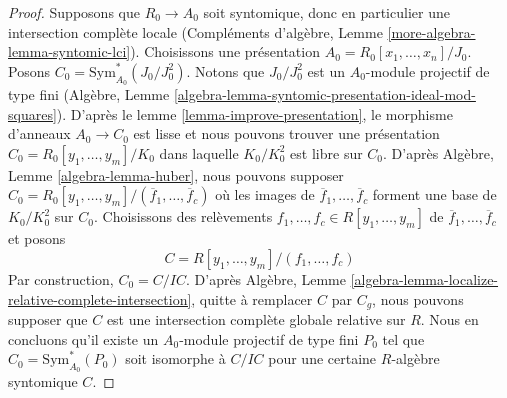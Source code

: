 \begin{proof}
Supposons que $R_0 \to A_0$ soit syntomique, donc en particulier une
intersection complète locale (Compléments d'algèbre, Lemme
\ref{more-algebra-lemma-syntomic-lci}).
Choisissons une présentation $A_0 = R_0[x_1, \ldots, x_n]/J_0$. Posons
$C_0 = \text{Sym}^*_{A_0}(J_0/J_0^2)$. Notons que $J_0/J_0^2$ est un
$A_0$-module projectif de type fini (Algèbre, Lemme
\ref{algebra-lemma-syntomic-presentation-ideal-mod-squares}).
D'après le lemme \ref{lemma-improve-presentation}, le morphisme d'anneaux
$A_0 \to C_0$ est lisse et nous pouvons trouver une présentation
$C_0 = R_0[y_1, \ldots, y_m]/K_0$ dans laquelle $K_0/K_0^2$ est libre sur
$C_0$. D'après Algèbre, Lemme \ref{algebra-lemma-huber}, nous pouvons supposer
$C_0 = R_0[y_1, \ldots, y_m]/(\overline{f}_1, \ldots, \overline{f}_c)$
où les images de $\overline{f}_1, \ldots, \overline{f}_c$ forment une base de
$K_0/K_0^2$ sur $C_0$. Choisissons des relèvements
$f_1, \ldots, f_c \in R[y_1, \ldots, y_m]$ de
$\overline{f}_1, \ldots, \overline{f}_c$ et posons
$$
C = R[y_1, \ldots, y_m]/(f_1, \ldots, f_c)
$$
Par construction, $C_0 = C/IC$. D'après Algèbre, Lemme
\ref{algebra-lemma-localize-relative-complete-intersection},
quitte à remplacer $C$ par $C_g$, nous pouvons supposer que $C$ est une
intersection complète globale relative sur $R$.
Nous en concluons qu'il existe un $A_0$-module projectif de type fini $P_0$ tel
que $C_0 = \text{Sym}^*_{A_0}(P_0)$ soit isomorphe à $C/IC$ pour une certaine
$R$-algèbre syntomique $C$.


\end{proof}
